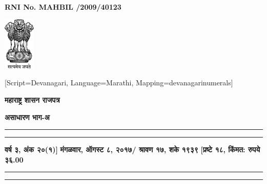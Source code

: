 \documentclass{report}
\begin{document}
\pagestyle{empty}
\begin{flushright}
  \textbf{RNI No. MAHBIL /2009/40123}
\end{flushright}


\newcommand{\rowstyle}[1]{{\small \bfseries #1}}
\begin{center}
  \includegraphics[width=1.5cm]{indiaemblem}

  \vskip 40pt

[Script=Devanagari, Language=Marathi, Mapping=devanagarinumerals]

{\Huge \bfseries महाराष्ट्र शासन राजपत्र}

  \vskip 20pt

{\Large \bfseries असाधारण भाग-अ}

\rule{\linewidth}{2pt}
\rule{\linewidth}{0.5pt}

  \rowstyle{वर्ष ३, अंक २०(१)]} \hspace{\fill}
  \rowstyle{मंगळवार, ऑगस्ट ८, २०१७/ श्रावण १७, शके १९३९} 
  \hspace{\fill}
  \rowstyle{ [प्रष्टे १८, किंमत: रुपये ३६.00} 


\rule{\linewidth}{0.5pt}
\rule{\linewidth}{2pt}

\end{center}
\end{document}
